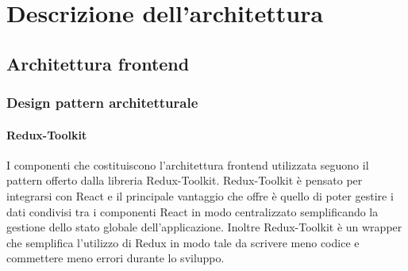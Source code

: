 \section{Descrizione dell'architettura}
\subsection{Architettura frontend}
\subsubsection{Design pattern architetturale}

\paragraph{Redux-Toolkit}
I componenti che costituiscono l'architettura frontend utilizzata seguono il
pattern offerto dalla libreria Redux-Toolkit. Redux-Toolkit è pensato per
integrarsi con React e il principale vantaggio che offre è quello di poter
gestire i dati condivisi tra i componenti React in modo centralizzato
semplificando la gestione dello stato globale dell'applicazione. Inoltre
Redux-Toolkit è un wrapper che semplifica l'utilizzo di Redux in modo tale da
scrivere meno codice e commettere meno errori durante lo sviluppo.

